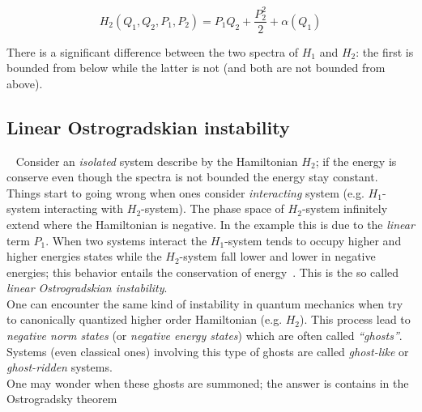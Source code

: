 \begin{equation} \label{eq: second-order_motion_eq_ham}
  H_2(Q_1, Q_2, P_1, P_2) = P_1Q_2 + \frac{P_2^2}{2} + \alpha(Q_1)
\end{equation}

There is a significant difference between the two spectra of $H_1$ and $H_2$:
the first is bounded from below while the latter is not (and both are not
bounded from above).


\subsection{Linear Ostrogradskian instability}~\label{subsection:
linear_ostrogradskian_instability}
Consider an \emph{isolated} system describe by the Hamiltonian $H_2$; if the
energy is conserve even though the spectra is not bounded the energy stay
constant. Things start to going wrong when ones consider \emph{interacting}
system (e.g. $H_1$-system interacting with $H_2$-system). The phase space of
$H_2$-system infinitely extend where the Hamiltonian is negative. In the example
this is due to the \emph{linear} term $P_1$. When two systems interact the
$H_1$-system tends to occupy higher and higher energies states while the
$H_2$-system fall lower and lower in negative energies; this behavior entails
the conservation of energy~\cite{Kallosh08, Eliezer89}.
This is the so called \emph{linear Ostrogradskian instability}. \\

One can encounter the same kind of instability in quantum mechanics when try to
canonically quantized higher order Hamiltonian (e.g. $H_2$). This process lead
to \emph{negative norm states} (or \emph{negative energy states}) which are
often called \emph{``ghosts''}. Systems (even classical ones) involving this
type of ghosts are called \emph{ghost-like} or \emph{ghost-ridden} systems. \\

One may wonder when these ghosts are summoned; the answer is contains in the
Ostrogradsky theorem

